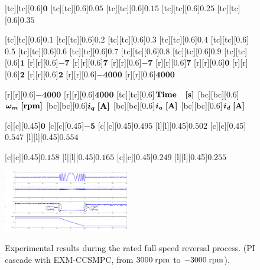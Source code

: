 \documentclass[a4paper, 8pt, twocolumn]{IEEEtran}
\begin{document}
\begin{figure}[htbp]
\def\size{0.6}
\def\sizetwo{0.45}
\centering
{}[tc][tc][\size]{$\bm{0}$}
[tc][tc][\size]{$\bm{0.05}$}
[tc][tc][\size]{$\bm{0.15}$}
[tc][tc][\size]{$\bm{0.25}$}
[tc][tc][\size]{$\bm{0.35}$}

[tc][tc][\size]{$\bm{0.1}$}
[tc][tc][\size]{$\bm{0.2}$}
[tc][tc][\size]{$\bm{0.3}$}
[tc][tc][\size]{$\bm{0.4}$}
[tc][tc][\size]{$\bm{0.5}$}
[tc][tc][\size]{$\bm{0.6}$}
[tc][tc][\size]{$\bm{0.7}$}
[tc][tc][\size]{$\bm{0.8}$}
[tc][tc][\size]{$\bm{0.9}$}
[tc][tc][\size]{$\bm{1}$}
[r][r][\size]{$\bm{-7}$}
[r][r][\size]{$\bm{7}$}
[r][r][\size]{$\bm{-7}$}
[r][r][\size]{$\bm{7}$}
[r][r][\size]{$\bm{0}$}
[r][r][\size]{$\bm{2}$}
[r][r][\size]{$\bm{2}$}
[r][r][\size]{$\bm{-4000}$}
[r][r][\size]{$\bm{4000}$}

[r][r][\size]{$\bm{-4000}$}
[r][r][\size]{$\bm{4000}$}
[tc][tc][\size]{$\rm \textbf{Time  \; [s]}$}
[bc][bc][\size]{$\bm{\omega_m}  \; \rm \textbf{[rpm]}$}
[bc][bc][\size]{$\bm{i_q}  \; \rm \textbf {[A]}$}
[bc][bc][\size]{$\bm{i_a}  \; \rm \textbf {[A]}$}
[bc][bc][\size]{$\bm{i_d}  \; \rm \textbf {[A]}$}

[c][c][\sizetwo]{$\bm{0}$}
[c][c][\sizetwo]{$\bm{-5}$}
[c][c][\sizetwo]{$\bm{0.495}$}
[l][l][\sizetwo]{$\bm{0.502}$}
[c][c][\sizetwo]{$\bm{0.547}$}
[l][l][\sizetwo]{$\bm{0.554}$}

[c][c][\sizetwo]{$\bm{0.158}$}
[l][l][\sizetwo]{$\bm{0.165}$}
[c][c][\sizetwo]{$\bm{0.249}$}
[l][l][\sizetwo]{$\bm{0.255}$}

\includegraphics[width=0.49\textwidth]{./figures/edb_reverse.eps}\\
\caption{Experimental results during the rated full-speed reversal process. (PI cascade with EXM-CCSMPC, from $\rm 3000 \; rpm$ to $\rm -3000 \; rpm$).}
\label{edb_reverse}
\end{figure}
\end{document}
